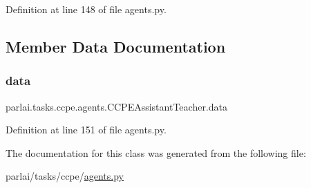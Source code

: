 Definition at line 148 of file agents.\+py.



\subsection{Member Data Documentation}
\mbox{\label{classparlai_1_1tasks_1_1ccpe_1_1agents_1_1CCPEAssistantTeacher_aeb95d397c64b27bdd7d99270a86ca190}} 
\subsubsection{\texorpdfstring{data}{data}}
{\footnotesize\ttfamily parlai.\+tasks.\+ccpe.\+agents.\+C\+C\+P\+E\+Assistant\+Teacher.\+data}



Definition at line 151 of file agents.\+py.



The documentation for this class was generated from the following file\+:\begin{DoxyCompactItemize}
\item 
parlai/tasks/ccpe/\hyperlink{parlai_2tasks_2ccpe_2agents_8py}{agents.\+py}\end{DoxyCompactItemize}
